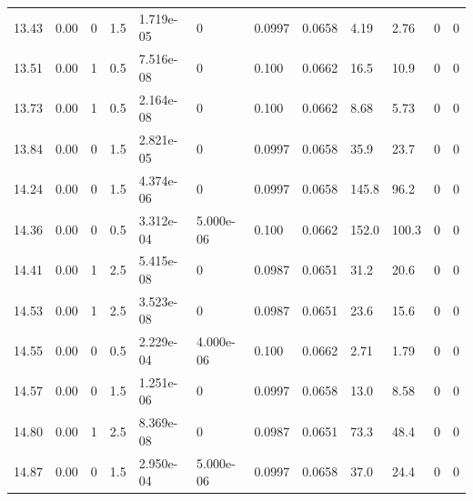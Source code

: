\documentclass[preview]{standalone}
\begin{document}
{{{\begin{tabular}{L{1.2cm}C{1.2cm} C{0.3cm}C{0.5cm} C{1.4cm}C{1.4cm} C{1.4cm}C{1.4cm} C{1.6cm}C{1.6cm} C{1.6cm}C{1.6cm}}
  13.43  &  0.00  & 0     & 1.5 &  1.719e-05  & 0  &  0.0997&   0.0658& 4.19 & 2.76   &  0 & 0  \\ 
  13.51  &  0.00  & 1     & 0.5 &  7.516e-08  & 0  &  0.100&   0.0662& 16.5 & 10.9   &  0 & 0  \\ 
  13.73  &  0.00  & 1     & 0.5 &  2.164e-08  & 0  &  0.100&   0.0662& 8.68 & 5.73   &  0 & 0  \\ 
  13.84  &  0.00  & 0     & 1.5 &  2.821e-05  & 0  &  0.0997&   0.0658& 35.9 & 23.7   &  0 & 0  \\ 
  14.24  &  0.00  & 0     & 1.5 &  4.374e-06  & 0  &  0.0997&   0.0658& 145.8 & 96.2   &  0 & 0  \\ 
  14.36  &  0.00  & 0     & 0.5 &  3.312e-04  & 5.000e-06  &  0.100&   0.0662& 152.0 & 100.3   &  0 & 0  \\ 
  14.41  &  0.00  & 1     & 2.5 &  5.415e-08  & 0  &  0.0987&   0.0651& 31.2 & 20.6   &  0 & 0  \\ 
  14.53  &  0.00  & 1     & 2.5 &  3.523e-08  & 0  &  0.0987&   0.0651& 23.6 & 15.6   &  0 & 0  \\ 
  14.55  &  0.00  & 0     & 0.5 &  2.229e-04  & 4.000e-06  &  0.100&   0.0662& 2.71 & 1.79   &  0 & 0  \\ 
  14.57  &  0.00  & 0     & 1.5 &  1.251e-06  & 0  &  0.0997&   0.0658& 13.0 & 8.58   &  0 & 0  \\ 
  14.80  &  0.00  & 1     & 2.5 &  8.369e-08  & 0  &  0.0987&   0.0651& 73.3 & 48.4   &  0 & 0  \\ 
  14.87  &  0.00  & 0     & 1.5 &  2.950e-04  & 5.000e-06  &  0.0997&   0.0658& 37.0 & 24.4   &  0 & 0  \\ 
\hline 
\end{tabular} 

}}}
\end{document}
